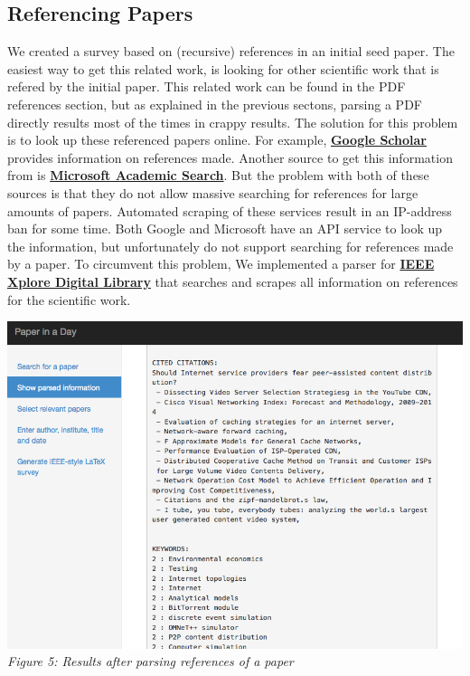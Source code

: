 \documentclass[12pt]{article}
\begin{document}
\subsection{Referencing Papers}
We created a survey based on (recursive) references in an initial seed paper. The easiest way to get this related work, is looking for other scientific work that is refered by the initial paper. This related work can be found in the PDF references section, but as explained in the previous sectons, parsing a PDF directly results most of the times in crappy results. The solution for this problem is to look up these referenced papers online. For example, \textbf{\href{http://scholar.google.com}{Google Scholar}} provides information on references made. Another source to get this information from is \textbf{\href{http://academic.research.microsoft.com/}{Microsoft Academic Search}}. But the problem with both of these sources is that they do not allow massive searching for references for large amounts of papers. Automated scraping of these services result in an IP-address ban for some time. Both Google and Microsoft have an API service to look up the information, but unfortunately do not support searching for references made by a paper. To circumvent this problem, We implemented a parser for \textbf{\href{http://ieeexplore.ieee.org/Xplore/home.jsp}{IEEE Xplore Digital Library}} that searches and scrapes all information on references for the scientific work.


\includegraphics[width=17cm]{../screenshots/citations-keywords.png}
\textit{\\Figure 5: Results after parsing references of a paper}\\\\
\end{document}
